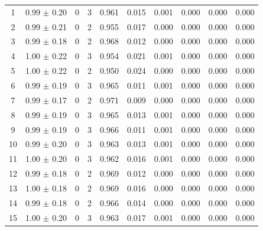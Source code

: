 \begin{table}[!h]
\begin{tabular}{ccccc ccccc}
 1 & 0.99 $\pm$ 0.20 & 0 & 3 & 0.961 & 0.015 & 0.001 & 0.000 & 0.000 & 0.000\\
 2 & 0.99 $\pm$ 0.21 & 0 & 2 & 0.955 & 0.017 & 0.000 & 0.000 & 0.000 & 0.000\\
 3 & 0.99 $\pm$ 0.18 & 0 & 2 & 0.968 & 0.012 & 0.000 & 0.000 & 0.000 & 0.000\\
 4 & 1.00 $\pm$ 0.22 & 0 & 3 & 0.954 & 0.021 & 0.001 & 0.000 & 0.000 & 0.000\\
 5 & 1.00 $\pm$ 0.22 & 0 & 2 & 0.950 & 0.024 & 0.000 & 0.000 & 0.000 & 0.000\\
 6 & 0.99 $\pm$ 0.19 & 0 & 3 & 0.965 & 0.011 & 0.001 & 0.000 & 0.000 & 0.000\\
 7 & 0.99 $\pm$ 0.17 & 0 & 2 & 0.971 & 0.009 & 0.000 & 0.000 & 0.000 & 0.000\\
 8 & 0.99 $\pm$ 0.19 & 0 & 3 & 0.965 & 0.013 & 0.001 & 0.000 & 0.000 & 0.000\\
 9 & 0.99 $\pm$ 0.19 & 0 & 3 & 0.966 & 0.011 & 0.001 & 0.000 & 0.000 & 0.000\\
 10 & 0.99 $\pm$ 0.20 & 0 & 3 & 0.963 & 0.013 & 0.001 & 0.000 & 0.000 & 0.000\\
 11 & 1.00 $\pm$ 0.20 & 0 & 3 & 0.962 & 0.016 & 0.001 & 0.000 & 0.000 & 0.000\\
 12 & 0.99 $\pm$ 0.18 & 0 & 2 & 0.969 & 0.012 & 0.000 & 0.000 & 0.000 & 0.000\\
 13 & 1.00 $\pm$ 0.18 & 0 & 2 & 0.969 & 0.016 & 0.000 & 0.000 & 0.000 & 0.000\\
 14 & 0.99 $\pm$ 0.18 & 0 & 2 & 0.966 & 0.014 & 0.000 & 0.000 & 0.000 & 0.000\\
 15 & 1.00 $\pm$ 0.20 & 0 & 3 & 0.963 & 0.017 & 0.001 & 0.000 & 0.000 & 0.000\\
\bottomrule
\end{tabular}
\end{table}

\clearpage


